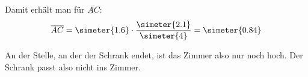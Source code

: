 \begin{exercise}
    Damit erhält man für $\overline{AC}$:
    \begin{equation*}
      \overline{AC}=\simeter{1.6}\cdot\frac{\simeter{2.1}}{\simeter{4}}
                   =\simeter{0.84}
    \end{equation*}

    An der Stelle, an der der Schrank endet, ist das Zimmer also nur
    noch  hoch. Der Schrank passt also nicht ins Zimmer.
  \fi
\end{exercise}
